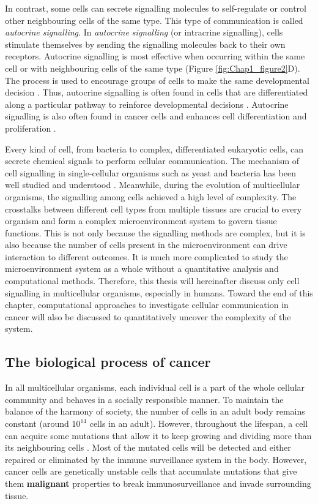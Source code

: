 In contrast, some cells can secrete signalling molecules to self-regulate or control other neighbouring cells of the same type. This type of communication is called \textit{autocrine signalling}. In \textit{autocrine signalling} (or intracrine signalling), cells stimulate themselves by sending the signalling molecules back to their own receptors. Autocrine signalling is most effective when occurring within the same cell or with neighbouring cells of the same type (Figure \ref{fig:Chap1_figure2}D). The process is used to encourage groups of cells to make the same developmental decision \cite{armingol2021deciphering, alberts2018molecular}. Thus, autocrine signalling is often found in cells that are differentiated along a particular pathway to reinforce developmental decisions \cite{alberts2018molecular}. Autocrine signalling is also often found in cancer cells and enhances cell differentiation and proliferation \cite{sporn1985autocrine}.  

Every kind of cell, from bacteria to complex, differentiated eukaryotic cells, can secrete chemical signals to perform cellular communication. The mechanism of cell signalling in single-cellular organisms such as yeast and bacteria has been well studied and understood \cite{alberts2018molecular}. Meanwhile, during the evolution of multicellular organisms, the signalling among cells achieved a high level of complexity. The crosstalks between different cell types from multiple tissues are crucial to every organism and form a complex microenvironment system to govern tissue functions. This is not only because the signalling methods are complex, but it is also because the number of cells present in the microenvironment can drive interaction to different outcomes. It is much more complicated to study the microenvironment system as a whole without a quantitative analysis and computational methods. Therefore, this thesis will hereinafter discuss only cell signalling in multicellular organisms, especially in humans. Toward the end of this chapter, computational approaches to investigate cellular communication in cancer will also be discussed to quantitatively uncover the complexity of the system. 

\subsection{The biological process of cancer}
In all multicellular organisms, each individual cell is a part of the whole cellular community and behaves in a socially responsible manner. To maintain the balance of the harmony of society, the number of cells in an adult body remains constant (around $10^{14}$ cells in an adult). However, throughout the lifespan, a cell can acquire some mutations that allow it to keep growing and dividing more than its neighbouring cells \cite{alberts2018molecular, greaves2012clonal}. Most of the mutated cells will be detected and either repaired or eliminated by the immune surveillance system in the body. However, cancer cells are genetically unstable cells that accumulate mutations that give them \textbf{malignant} properties to break immunosurveillance and invade surrounding tissue. 

